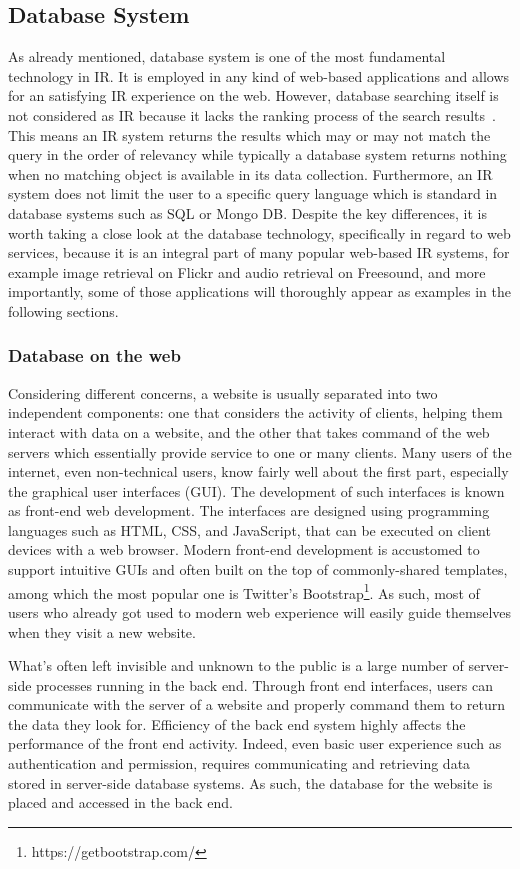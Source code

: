 \subsection{Database System}
As already mentioned, database system is one of the most fundamental technology in IR.  It is employed in any kind of web-based applications and allows for an satisfying IR experience on the web. However, database searching itself is not considered as IR because it lacks the ranking process of the search results~\cite{jansen2010}. This means an IR system returns the results which may or may not match the query in the order of relevancy while typically a database system returns nothing when no matching object is available in its data collection. Furthermore, an IR system does not limit the user to a specific query language which is standard in database systems such as SQL or Mongo DB.
Despite the key differences, it is worth taking a close look at the database technology, specifically in regard to web services, because it is an integral part of many popular web-based IR systems, for example image retrieval on Flickr and audio retrieval on Freesound, and more importantly, some of those applications will thoroughly appear as examples in the following sections. 

\subsubsection{Database on the web}

Considering different concerns, a website is usually separated into two independent components: one that considers the activity of clients, helping them interact with data on a website, and the other that takes command of the web servers which essentially provide service to one or many clients. Many users of the internet, even non-technical users, know fairly well about the first part, especially the graphical user interfaces (GUI). The development of such interfaces is known as front-end web development. The interfaces are designed using programming languages such as HTML, CSS, and JavaScript, that can be executed on client devices with a web browser. Modern front-end development is accustomed to support intuitive GUIs and often built on the top of commonly-shared templates, among which the most popular one is Twitter's Bootstrap\footnote{https://getbootstrap.com/}. As such, most of users who already got used to modern web experience will easily guide themselves when they visit a new website.

What's often left invisible and unknown to the public is a large number of server-side processes running in the back end. Through front end interfaces, users can communicate with the server of a website and properly command them to return the data they look for. Efficiency of the back end system highly affects the performance of the front end activity. Indeed, even basic user experience such as authentication and permission, requires communicating and retrieving data stored in server-side database systems. As such, the database for the website is placed and accessed in the back end.

